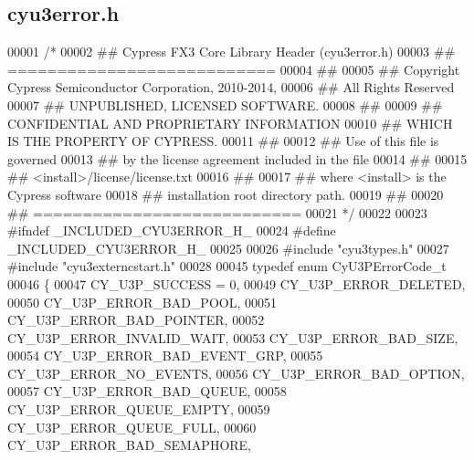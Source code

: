 \subsection{cyu3error.\+h}
\label{cyu3error_8h_source}

\begin{DoxyCode}
00001 \textcolor{comment}{/*}
00002 \textcolor{comment}{ ## Cypress FX3 Core Library Header (cyu3error.h)}
00003 \textcolor{comment}{ ## ===========================}
00004 \textcolor{comment}{ ##}
00005 \textcolor{comment}{ ##  Copyright Cypress Semiconductor Corporation, 2010-2014,}
00006 \textcolor{comment}{ ##  All Rights Reserved}
00007 \textcolor{comment}{ ##  UNPUBLISHED, LICENSED SOFTWARE.}
00008 \textcolor{comment}{ ##}
00009 \textcolor{comment}{ ##  CONFIDENTIAL AND PROPRIETARY INFORMATION}
00010 \textcolor{comment}{ ##  WHICH IS THE PROPERTY OF CYPRESS.}
00011 \textcolor{comment}{ ##}
00012 \textcolor{comment}{ ##  Use of this file is governed}
00013 \textcolor{comment}{ ##  by the license agreement included in the file}
00014 \textcolor{comment}{ ##}
00015 \textcolor{comment}{ ##     <install>/license/license.txt}
00016 \textcolor{comment}{ ##}
00017 \textcolor{comment}{ ##  where <install> is the Cypress software}
00018 \textcolor{comment}{ ##  installation root directory path.}
00019 \textcolor{comment}{ ##}
00020 \textcolor{comment}{ ## ===========================}
00021 \textcolor{comment}{ */}
00022 
00023 \textcolor{preprocessor}{#ifndef \_INCLUDED\_CYU3ERROR\_H\_}
00024 \textcolor{preprocessor}{#define \_INCLUDED\_CYU3ERROR\_H\_}
00025 
00026 \textcolor{preprocessor}{#include "cyu3types.h"}
00027 \textcolor{preprocessor}{#include "cyu3externcstart.h"}
00028 
00045 \textcolor{keyword}{typedef} \textcolor{keyword}{enum} CyU3PErrorCode_t
00046 \{
00047     CY_U3P_SUCCESS = 0,                 
00049     CY_U3P_ERROR_DELETED,               
00050     CY_U3P_ERROR_BAD_POOL,              
00051     CY_U3P_ERROR_BAD_POINTER,           
00052     CY_U3P_ERROR_INVALID_WAIT,          
00053     CY_U3P_ERROR_BAD_SIZE,              
00054     CY_U3P_ERROR_BAD_EVENT_GRP,         
00055     CY_U3P_ERROR_NO_EVENTS,             
00056     CY_U3P_ERROR_BAD_OPTION,            
00057     CY_U3P_ERROR_BAD_QUEUE,             
00058     CY_U3P_ERROR_QUEUE_EMPTY,           
00059     CY_U3P_ERROR_QUEUE_FULL,            
00060     CY_U3P_ERROR_BAD_SEMAPHORE,         

\end{DoxyCode}
